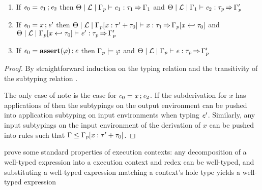 \begin{lemma}[Inversion]
\begin{enumerate}
\begin{itemize}
    \end{itemize}
  \item If $ \mathit{e_{{\mathrm{0}}}}  =  \mathit{e_{{\mathrm{1}}}}  \operatorname{;}  \mathit{e_{{\mathrm{2}}}} $ then $ \Theta   \mid   \mathcal{L}   \mid   \Gamma_{\mathit{p}}   \vdash   \mathit{e_{{\mathrm{1}}}}  :  \tau_{{\mathrm{1}}}   \operatorname{\Rightarrow}   \Gamma_{{\mathrm{1}}} $ and $ \Theta   \mid   \mathcal{L}   \mid   \Gamma_{{\mathrm{1}}}   \vdash   \mathit{e_{{\mathrm{2}}}}  :  \tau_{\mathit{p}}   \operatorname{\Rightarrow}   \Gamma'_{\mathit{p}} $
  \item If $ \mathit{e_{{\mathrm{0}}}}  =  \mathit{x}  \operatorname{;}  \mathit{e'} $ then $ \Theta   \mid   \mathcal{L}   \mid   \Gamma_{\mathit{p}}  [  \mathit{x}  :  \tau'  +  \tau_{{\mathrm{0}}}  ]   \vdash   \mathit{x}  :  \tau_{{\mathrm{1}}}   \operatorname{\Rightarrow}   \Gamma_{\mathit{p}}  [  \mathit{x}  \hookleftarrow  \tau_{{\mathrm{0}}}  ] $ and $ \Theta   \mid   \mathcal{L}   \mid   \Gamma_{\mathit{p}}  [  \mathit{x}  \hookleftarrow  \tau_{{\mathrm{0}}}  ]   \vdash   \mathit{e'}  :  \tau_{\mathit{p}}   \operatorname{\Rightarrow}   \Gamma'_{\mathit{p}} $
  \item If $\mathit{e_{{\mathrm{0}}}}  =   \mathbf{assert}( \varphi ) \operatorname{;}  \mathit{e} $ then $\Gamma_{\mathit{p}}  \models  \varphi$ and $ \Theta   \mid   \mathcal{L}   \mid   \Gamma_{\mathit{p}}   \vdash   \mathit{e}  :  \tau_{\mathit{p}}   \operatorname{\Rightarrow}   \Gamma'_{\mathit{p}} $
  \end{enumerate}
\end{lemma}
\begin{proof}
  By straightforward induction on the typing relation and
  the transitivity of the subtyping relation .

  The only case of note is the case for $ \mathit{e_{{\mathrm{0}}}}  =  \mathit{x}  \operatorname{;}  \mathit{e_{{\mathrm{2}}}} $. If the subderivation for $\mathit{x}$
  has applications of  then the subtypings on the output environment can be pushed
  into application subtyping on input environments when typing $\mathit{e'}$. Similarly,
  any input subtypings on the input environment of the derivation of $\mathit{x}$ can be pushed
  into  rules such that $\Gamma  \leq  \Gamma_{\mathit{p}}  [  \mathit{x}  :  \tau'  +  \tau_{{\mathrm{0}}}  ]$.
\end{proof}

 prove some standard properties of execution contexts:
any decomposition of a well-typed expression into a execution context and redex can be well-typed,
and substituting a well-typed expression matching a context's hole type yields a well-typed expression

